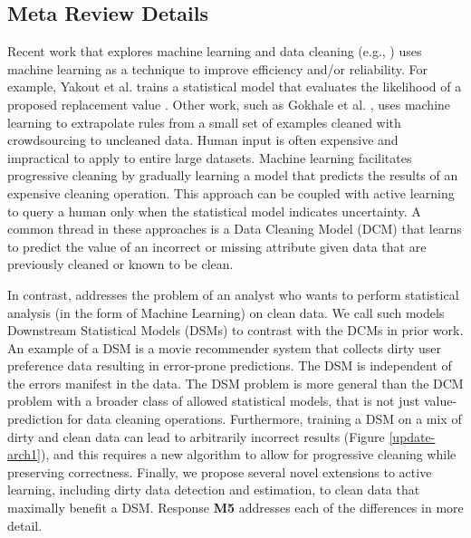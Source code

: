 \subsection*{Meta Review Details} 
Recent work that explores machine learning and data cleaning (e.g., \cite{yakout2013don,gokhale2014corleone}) uses machine learning as a technique to improve efficiency and/or reliability.
For example, Yakout et al. trains a statistical model that evaluates the likelihood of a proposed replacement value \cite{yakout2013don}.
Other work, such as Gokhale et al. \cite{gokhale2014corleone}, uses machine learning to extrapolate rules from a small set of examples cleaned with crowdsourcing to uncleaned data.
Human input is often expensive and impractical to apply to entire large datasets. 
Machine learning facilitates progressive cleaning by gradually learning a model that predicts the results of an expensive cleaning operation.
This approach can be coupled with active learning to query a human only when the statistical model indicates uncertainty.
A common thread in these approaches is a Data Cleaning Model (DCM) that learns to predict the value of an incorrect or missing attribute given data that are previously cleaned or known to be clean.

In contrast, \sys addresses the problem of an analyst who wants to perform statistical analysis (in the form of Machine Learning) on clean data.
We call such models Downstream Statistical Models (DSMs) to contrast with the DCMs in prior work.
An example of a DSM is a movie recommender system that collects dirty user preference data resulting in error-prone predictions.
The DSM is independent of the errors manifest in the data.
The DSM problem is more general than the DCM problem with a broader class of allowed statistical models, that is not just value-prediction for data cleaning operations.
Furthermore, training a DSM on a mix of dirty and clean data can lead to arbitrarily incorrect results (Figure \ref{update-arch1}), and this requires a new algorithm to allow for progressive cleaning while preserving correctness.
Finally, we propose several novel extensions to active learning, including dirty data detection and estimation, to clean data that maximally benefit a DSM.
Response \textbf{M5} addresses each of the differences in more detail.


\vspace{0.5em}

